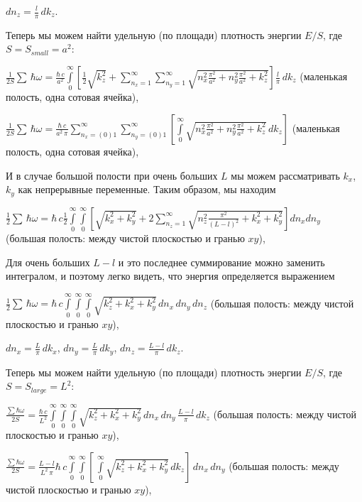 \documentclass[11pt]{article}
\begin{document}
\(dn_z = \frac{l}{\pi}\,dk_z\).

    Теперь мы можем найти удельную (по площади) плотность энергии \(E/S\),
где \(S = S_{small} = a^2\):

    \(\frac{1}{2 S}\sum\,\hbar\omega = \frac{\hbar\,c}{a^2}\int\limits_{0}^{\infty}\left[{\frac{1}{2}\sqrt{k_z^2}+\sum\limits_{n_x=1}^{\infty}\sum\limits_{n_y=1}^{\infty}\sqrt{n_x^2\frac{\pi^2}{a^2}+n_y^2\frac{\pi^2}{a^2}+k_z^2}}\right]\frac{l}{\pi}\,dk_z\)
(маленькая полость, одна сотовая ячейка),

    \(\frac{1}{2 S}\sum\,\hbar\omega = \frac{\hbar\,c}{a^2\,\pi}\sum\limits_{n_x=(0)1}^{\infty}\sum\limits_{n_y=(0)1}^{\infty}\left[\int\limits_{0}^{\infty}\sqrt{n_x^2\frac{\pi^2}{a^2}+n_y^2\frac{\pi^2}{a^2}+k_z^2}\,dk_z\right]\)
(маленькая полость, одна сотовая ячейка),

    И в случае большой полости при очень больших \(L\) мы можем
рассматривать \(k_x\), \(k_y\) как непрерывные переменные. Таким
образом, мы находим

\(\frac{1}{2}\sum\,\hbar\omega = \hbar\,c\frac{1}{2}\int\limits_{0}^{\infty}\int\limits_{0}^{\infty}\left[{\sqrt{k_x^2+k_y^2}+2\sum\limits_{n_z=1}^{\infty}\sqrt{n_z^2\frac{\pi^2}{(L-l)^2}+k_x^2+k_y^2}}\right]d{n_x}d{n_y}\)
(большая полость: между чистой плоскостью и гранью \(xy\)),

Для очень больших \(L-l\) и это последнее суммирование можно заменить
интегралом, и поэтому легко видеть, что энергия определяется выражением

\(\frac{1}{2}\sum\,\hbar\omega = \hbar\,c\int\limits_{0}^{\infty}\int\limits_{0}^{\infty}\int\limits_{0}^{\infty}\sqrt{k_z^2+k_x^2+k_y^2}\,d{n_x}\,d{n_y}\,d{n_z}\)
(большая полость: между чистой плоскостью и гранью \(xy\)),

\(dn_x = \frac{L}{\pi}\,dk_x\), \(dn_y = \frac{L}{\pi}\,dk_y\),
\(dn_z = \frac{L-l}{\pi}\,dk_z\).

    Теперь мы можем найти удельную (по площади) плотность энергии \(E/S\),
где \(S = S_{large} = L^2\):

\(\frac{\sum\hbar\omega}{2 S} = \frac{\hbar\,c}{L^2}\int\limits_{0}^{\infty}\int\limits_{0}^{\infty}\int\limits_{0}^{\infty}\sqrt{k_z^2+k_x^2+k_y^2}\,dn_x\,dn_y\,\frac{L-l}{\pi}\,dk_z\)
(большая полость: между чистой плоскостью и гранью \(xy\)),

\(\frac{\sum\hbar\omega}{2 S} = \frac{L-l}{L^2\,\pi}\hbar\,c\int\limits_{0}^{\infty}\int\limits_{0}^{\infty}\left[\,\int\limits_{0}^{\infty}\sqrt{k_z^2+k_x^2+k_y^2}\,dk_z\right]\,dn_x\,dn_y\)
(большая полость: между чистой плоскостью и гранью \(xy\)),
\end{document}
